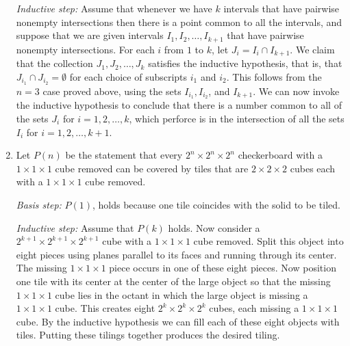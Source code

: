 \documentclass{../../cls/sig-alternate-05-2015}
\begin{document}
\begin{enumerate}
\textit{Inductive step:} Assume that whenever we have $k$ intervals that have pairwise nonempty intersections then there is a point common to all the intervals,
and suppose that we are given intervals $I_1, I_2, \ldots, I_{k + 1}$ that have pairwise nonempty intersections.
For each $i$ from $1$ to $k$, let $J_i = I_i \cap I_{k + 1}$.
We claim that the collection $J_1, J_2, \ldots, J_k$ satisfies the inductive hypothesis,
that is, that $J_{i_1} \cap J_{i_2} = \emptyset$ for each choice of subscripts $i_1$ and $i_2$.
This follows from the $n = 3$ case proved above,
using the sets $I_{i_1}, I_{i_2}$, and $I_{k + 1}$.
We can now invoke the inductive hypothesis to conclude that there is a number common to all of the sets $J_i$ for $i = 1, 2, \ldots, k$,
which perforce is in the intersection of all the sets $I_i$ for $i = 1, 2, \ldots, k + 1$.

\item Let $P(n)$ be the statement that every $2^n \times 2^n \times 2^n$ checkerboard with a $1 \times 1 \times 1$ cube removed can be covered by tiles that are $2 \times 2 \times 2$ cubes each with a $1 \times 1 \times 1$ cube removed.

\textit{Basis step:} $P(1)$,
holds because one tile coincides with the solid to be tiled.

\textit{Inductive step:} Assume that $P(k)$ holds.
Now consider a $2^{k + 1} \times 2^{k + 1} \times 2^{k + 1}$ cube with a $ 1 \times 1 \times 1$ cube removed.
Split this object into eight pieces using planes parallel to its faces and running through its center.
The missing $1 \times 1 \times 1$ piece occurs in one of these eight pieces.
Now position one tile with its center at the center of the large object so that the missing $1 \times 1 \times 1$ cube lies in the octant in which the large object is missing a $1 \times 1 \times 1$ cube.
This creates eight $2^k \times 2^k \times 2^k$ cubes,
each missing a $1 \times 1 \times 1$ cube.
By the inductive hypothesis we can fill each of these eight objects with tiles.
Putting these tilings together produces the desired tiling.

\end{enumerate}
\end{document}
